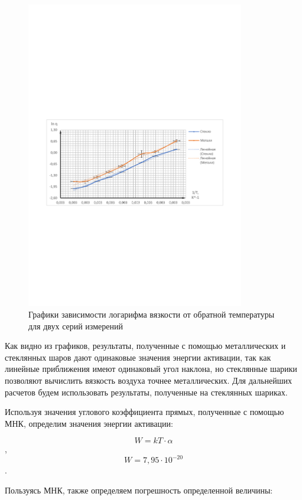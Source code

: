 \documentclass[12pt,a4paper]{article}
\begin{document}
\begin{figure}[h!]
	\begin{center}
		\includegraphics[width = 0.85\textwidth]{Ln visconsin (1)}
		\caption{Графики зависимости логарифма вязкости от обратной температуры для двух серий измерений}
		\label{fig:graph_one}
	\end{center}
\end{figure}

Как видно из графиков, результаты, полученные с помощью металлических и стеклянных шаров дают одинаковые значения энергии активации, так как линейные приближения имеют одинаковый угол наклона, но стеклянные шарики позволяют вычислить вязкость воздуха точнее металлических. Для дальнейших расчетов будем использовать результаты, полученные на стеклянных шариках.

Используя значения углового коэффициента прямых, полученные с помощью МНК, определим значения энергии активации:

$$W = kT \cdot \alpha $$, $$W = 7,95\cdot 10^{-20}$$. 

Пользуясь МНК, также определяем погрешность определенной величины:
\end{document}
